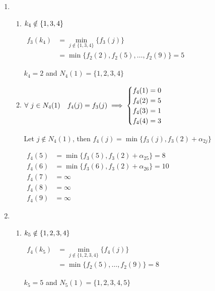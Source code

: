 \begin{prob}
\begin{sol}
\begin{enumerate}[label = {$\underline{i =\arabic*:}$}]
    \item \hspace{0.1cm} \\
    \begin{enumerate}[start = 1, label = {\protect\trc{$\mathbf{S_{\arabic*}}$}}]
    \item $k_4\notin\left\{1,3,4\right\}$
    
    $\begin{aligned}
    f_3(k_4) &= \min\limits_{j\notin\{1,3,4\}}\{f_3(j)\} \\
             &= \min\{f_2(2),f_2(5),\dots,f_2(9)\}=5
    \end{aligned}$
    
    \imp $k_4=2$ and $N_4(1)=\{1,2,3,4\}$
    
    \item $\forall \ j\in N_4(1)\quad f_4(j)=f_3(j)\implies \begin{cases} f_4(1)=0 \\ f_4(2)=5 \\ f_4(3)=1 \\ f_4(4)=3 \end{cases}$
    
    Let $j\notin N_4(1)$, then $f_4(j)=\min\{f_3(j),f_3(2)+\alpha_{2j}\}$
    
    $\begin{aligned}
    f_4(5) &= \min\{f_3(5), f_3(2) + \alpha_{25}\}=8 \\
    f_4(6) &= \min\{f_3(6), f_3(2) + \alpha_{26}\}=10\\
    f_4(7) &= \infty \\
    f_4(8) &= \infty \\
    f_4(9) &= \infty 
    \end{aligned}$
    \end{enumerate}
    
    \item \hspace{0.1cm} \\
    \begin{enumerate}[start = 1, label = {\protect\trc{$\mathbf{S_{\arabic*}}$}}]
    \item $k_5\notin\left\{1,2,3,4\right\}$
    
    $\begin{aligned}
    f_4(k_5) &= \min\limits_{j\notin\{1,2,3,4\}}\{f_4(j)\} \\
             &= \min\{f_2(5),\dots,f_2(9)\}=8
    \end{aligned}$
    
    \imp $k_5=5$ and $N_5(1)=\{1,2,3,4,5\}$
    

\end{enumerate}
\end{enumerate}
\end{sol}
\end{prob}
